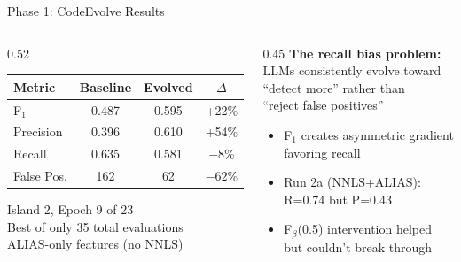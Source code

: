 \documentclass[aspectratio=169,12pt]{beamer}
\begin{document}
\begin{frame}{Phase 1: CodeEvolve Results}
  \begin{columns}[T]
    \begin{column}{0.52\textwidth}
      {\small
      \begin{table}
        \centering
        \begin{tabular}{@{}lccc@{}}
          \toprule
          Metric & Baseline & Evolved & $\Delta$ \\
          \midrule
          F$_1$ & 0.487 & \alert{0.595} & \alert{+22\%} \\
          Precision & 0.396 & \alert{0.610} & \alert{+54\%} \\
          Recall & 0.635 & 0.581 & $-8$\% \\
          False Pos. & 162 & \alert{62} & \alert{$-62$\%} \\
          \bottomrule
        \end{tabular}
      \end{table}
      }

      \vspace{0.3em}
      {\small Island 2, Epoch 9 of 23\\
       Best of only \alert{35 total evaluations}\\
       ALIAS-only features (no NNLS)}
    \end{column}
    \begin{column}{0.45\textwidth}
      \textbf{The recall bias problem:}\\
      LLMs consistently evolve toward\\
      ``detect more'' rather than\\
      ``reject false positives''

      \vspace{0.5em}
      {\small
      \begin{itemize}
        \item F$_1$ creates asymmetric gradient\\
              favoring recall
        \item Run 2a (NNLS+ALIAS):\\
              R=0.74 but P=0.43
        \item F$_\beta$(0.5) intervention helped\\
              but couldn't break through
      \end{itemize}
      }


\end{column}
\end{columns}
\end{frame}
\end{document}
